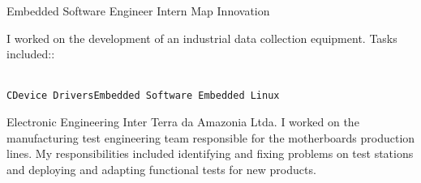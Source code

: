 \documentclass[10pt]{developercv} %
\begin{document}
\begin{entrylist}
  {Embedded Software Engineer Intern}
  {Map Innovation}
  {
    I worked on the development of an industrial data collection equipment. 
Tasks included::\\
    \begin{contributionlist}
    \end{contributionlist}\\
\texttt{C}\slashsep\texttt{Device 
Drivers}\slashsep\texttt{Embedded Software}\slashsep\texttt 
{ Embedded Linux }}

  {Electronic Engineering Inter}
  {Terra da Amazonia Ltda.}
  {I worked on the manufacturing test engineering team responsible for the 
motherboards production lines. My responsibilities included identifying and 
fixing problems on test stations and deploying and adapting functional tests for 
new products.}
\end{entrylist}


\begin{minipage}[t]{0.3\textwidth}
  \vspace{-\baselineskip} %


  \begin{skills}
  \end{skills}
\end{minipage}
\end{document}
